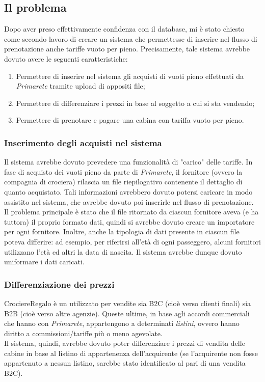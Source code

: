 \subsection{Il problema}
Dopo aver preso effettivamente confidenza con il database, mi è stato chiesto come secondo lavoro di creare un sistema che permettesse di inserire nel flusso di prenotazione anche tariffe vuoto per pieno. Precisamente, tale sistema avrebbe dovuto avere le seguenti caratteristiche:
\begin{enumerate}
	\item Permettere di inserire nel sistema gli acquisti di vuoti pieno effettuati da \textit{Primarete} tramite upload di appositi file;
	\item Permettere di differenziare i prezzi in base al soggetto a cui si sta vendendo;
	\item Permettere di prenotare e pagare una cabina con tariffa vuoto per pieno.
\end{enumerate}

\subsubsection{Inserimento degli acquisti nel sistema}
Il sistema avrebbe dovuto prevedere una funzionalità di "carico" delle tariffe. In fase di acquisto dei vuoti pieno da parte di \textit{Primarete}, il fornitore (ovvero la compagnia di crociera) rilascia un file riepilogativo contenente il dettaglio di quanto acquistato. Tali informazioni avrebbero dovuto potersi caricare in modo assistito nel sistema, che avrebbe dovuto poi inserirle nel flusso di prenotazione.\\
Il problema principale è stato che il file ritornato da ciascun fornitore aveva (e ha tuttora) il proprio formato dati, quindi si avrebbe dovuto creare un importatore per ogni fornitore. Inoltre, anche la tipologia di dati presente in ciascun file poteva differire: ad esempio, per riferirsi all'età di ogni passeggero, alcuni fornitori utilizzano l'età ed altri la data di nascita. Il sistema avrebbe dunque dovuto uniformare i dati caricati.

\subsubsection{Differenziazione dei prezzi}
CrociereRegalo è un \bookingEngine utilizzato per vendite sia B2C (cioè verso clienti finali) sia B2B (cioè verso altre agenzie). Queste ultime, in base agli accordi commerciali che hanno con \textit{Primarete}, appartengono a determinati \textit{listini}, ovvero hanno diritto a commissioni/tariffe più o meno agevolate.\\Il sistema, quindi, avrebbe dovuto poter differenziare i prezzi di vendita delle cabine in base al listino di appartenenza dell'acquirente (se l'acquirente non fosse appartenuto a nessun listino, sarebbe stato identificato al pari di una vendita B2C).

